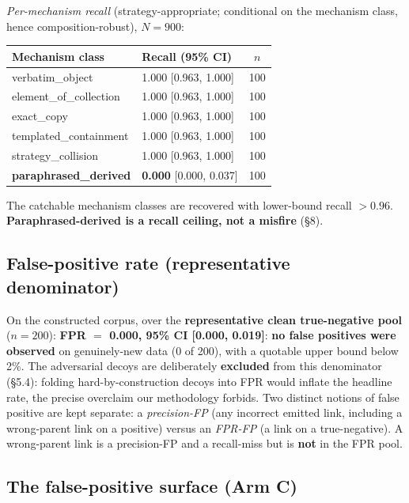 \documentclass[11pt]{article}
\begin{document}
\emph{Per-mechanism recall} (strategy-appropriate; conditional on the mechanism class, hence
composition-robust), $N=900$:

\begin{table}[h]
\centering
\small
\begin{tabular}{@{}llc@{}}
\toprule
Mechanism class & Recall (95\% CI) & $n$ \\
\midrule
verbatim\_object & 1.000 [0.963, 1.000] & 100 \\
element\_of\_collection & 1.000 [0.963, 1.000] & 100 \\
exact\_copy & 1.000 [0.963, 1.000] & 100 \\
templated\_containment & 1.000 [0.963, 1.000] & 100 \\
strategy\_collision & 1.000 [0.963, 1.000] & 100 \\
\textbf{paraphrased\_derived} & \textbf{0.000} [0.000, 0.037] & 100 \\
\bottomrule
\end{tabular}
\end{table}

The catchable mechanism classes are recovered with lower-bound recall $>0.96$. \textbf{Paraphrased-derived
is a recall ceiling, not a misfire} (\S8).

\subsection{False-positive rate (representative denominator)}

On the constructed corpus, over the \textbf{representative clean true-negative pool} ($n=200$): \textbf{FPR
$=$ 0.000, 95\% CI [0.000, 0.019]}: \textbf{no false positives were observed} on genuinely-new data (0 of
200), with a quotable upper bound below 2\%. The adversarial decoys are deliberately \textbf{excluded} from
this denominator (\S5.4): folding hard-by-construction decoys into FPR would inflate the headline rate, the
precise overclaim our methodology forbids. Two distinct notions of false positive are kept separate: a
\emph{precision-FP} (any incorrect emitted link, including a wrong-parent link on a positive) versus an
\emph{FPR-FP} (a link on a true-negative). A wrong-parent link is a precision-FP and a recall-miss but is
\textbf{not} in the FPR pool.

\subsection{The false-positive surface (Arm C)}
\end{document}
